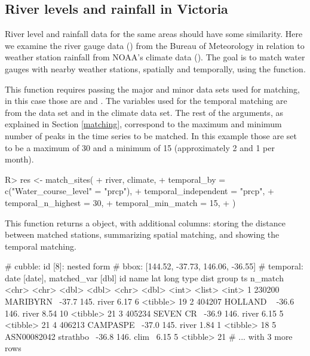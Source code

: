 \documentclass[
  shortnames]{jss}
\begin{document}
\hypertarget{river-levels-and-rainfall-in-victoria}{%
\subsection{River levels and rainfall in Victoria}\label{river-levels-and-rainfall-in-victoria}}

River level and rainfall data for the same areas should have some similarity. Here we examine the river gauge data () from the Bureau of Meteorology \citep{bom} in relation to weather station rainfall from NOAA's climate data (). The goal is to match water gauges with nearby weather stations, spatially and temporally, using the  function.

This function requires passing the major and minor data sets used for matching, in this case those are  and . The variables used for the temporal matching are  from the  data set and  in the climate data set. The rest of the arguments, as explained in Section \ref{matching}, correspond to the maximum and minimum number of peaks in the time series to be matched. In this example those are set to be a maximum of 30 and a minimum of 15 (approximately 2 and 1 per month).

\begin{CodeChunk}
\begin{CodeInput}
R> res <- match_sites(
+   river, climate,
+   temporal_by = c("Water_course_level" = "prcp"),
+   temporal_independent = "prcp",  
+   temporal_n_highest = 30,
+   temporal_min_match = 15, 
+ )
\end{CodeInput}
\end{CodeChunk}

This function returns a  object, with additional columns:  storing the distance between matched stations,  summarizing spatial matching, and  showing the temporal matching.

\begin{CodeChunk}
\begin{CodeOutput}
# cubble:   id [8]: nested form
# bbox:     [144.52, -37.73, 146.06, -36.55]
# temporal: date [date], matched_var [dbl]
  id          name        lat  long type   dist group ts       n_match
  <chr>       <chr>     <dbl> <dbl> <chr> <dbl> <int> <list>     <int>
1 230200      MARIBYRN~ -37.7  145. river  6.17     6 <tibble>      19
2 404207      HOLLAND ~ -36.6  146. river  8.54    10 <tibble>      21
3 405234      SEVEN CR~ -36.9  146. river  6.15     5 <tibble>      21
4 406213      CAMPASPE~ -37.0  145. river  1.84     1 <tibble>      18
5 ASN00082042 strathbo~ -36.8  146. clim~  6.15     5 <tibble>      21
# ... with 3 more rows
\end{CodeOutput}
\end{CodeChunk}
\end{document}
